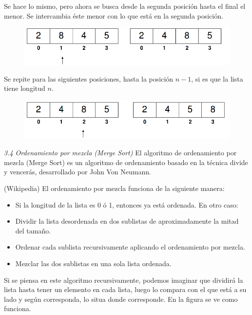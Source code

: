 \documentclass[twoside,10.5pt]{article}%
\begin{document}
Se hace lo mismo, pero ahora se busca desde la segunda posici\'on hasta el final el menor. Se intercambia \'este menor con lo que est\'a en la segunda posici\'on.

\begin{figure}[h]
   \centering
   \includegraphics[scale=.35]{selec2.png}
  \end{figure}

Se repite para las siguientes posiciones, hasta la posici\'on $n-1$, si es que la lista  tiene longitud $n$.

\begin{figure}[h]
    \centering
    \includegraphics[scale=.35]{selec3.png}
   \end{figure}
 

\emph{3.4 Ordenamiento por mezcla (Merge Sort)}
El algoritmo de ordenamiento por mezcla (Merge Sort) es un algoritmo de ordenamiento  basado en la {\color{red}t\'ecnica divide y vencer\'as}, desarrollado por John Von Neumann.

(Wikipedia) El ordenamiento por mezcla funciona de la siguiente manera:
\begin{itemize}
\item Si la longitud de la lista es 0 \'o 1, entonces ya est\'a ordenada. En otro caso:
\item Dividir la lista desordenada en dos sublistas de aproximadamente la mitad del tama\~no.
\item Ordenar cada sublista recursivamente aplicando el ordenamiento por mezcla.
\item Mezclar las dos sublistas en una sola lista ordenada.
\end{itemize}

Si se piensa en este algoritmo recursivamente, podemos imaginar que dividir\'a la lista
hasta tener un elemento en cada lista, luego lo compara con el que est\'a a su lado y
seg\'un corresponda, lo situa donde corresponde. En la figura se ve como funciona.
\end{document}
